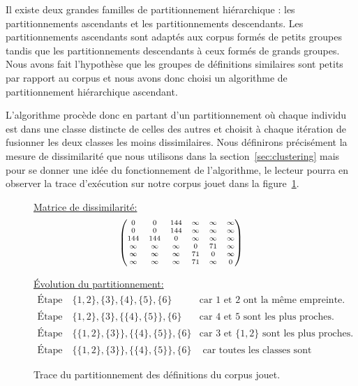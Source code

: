 Il existe deux grandes familles de partitionnement hiérarchique : les
partitionnements ascendants et les partitionnements descendants. Les
partitionnements ascendants sont adaptés aux corpus formés de petits
groupes tandis que les partitionnements descendants à ceux formés de
grands groupes. Nous avons fait l'hypothèse que les groupes de
définitions similaires sont petits par rapport au corpus et nous avons
donc choisi un algorithme de partitionnement hiérarchique ascendant.

L'algorithme procède donc en partant d'un partitionnement où chaque
individu est dans une classe distincte de celles des autres et choisit
à chaque itération de fusionner les deux classes les moins
dissimilaires. Nous définirons précisément la mesure de dissimilarité
que nous utilisons dans la section~\ref{sec:clustering} mais pour
se donner une idée du fonctionnement de l'algorithme, le lecteur
pourra en observer la trace d'exécution sur notre corpus jouet
dans la figure~\ref{fig:clustering-jouet}.

\begin{figure}
\underline{Matrice de dissimilarité:}
\[\scriptsize
\begin{pmatrix}
0 & 0 & 144 & \infty & \infty & \infty \\
0 & 0 & 144 & \infty & \infty & \infty \\
144 & 144 & 0 & \infty & \infty & \infty \\
\infty & \infty & \infty & 0 & 71 & \infty \\
\infty & \infty & \infty & 71 & 0 & \infty \\
\infty & \infty & \infty & 71 & \infty & 0 \\
\end{pmatrix}
\]

\underline{Évolution du partitionnement:}
\[
\begin{array}{rclr}
\text{Étape 1} & \{ 1, 2 \}, \{ 3 \}, \{ 4 \}, \{ 5 \}, \{ 6 \}
& \text{car }1 \text{ et } 2 \text{ ont la même empreinte.} \\
\text{Étape 2} & \{ 1, 2 \}, \{ 3 \}, \{ \{ 4 \}, \{ 5 \} \}, \{ 6 \}
& \text{car }4 \text{ et } 5 \text{ sont les plus proches.} \\
\text{Étape 3} & \{ \{ 1, 2 \}, \{ 3 \} \}, \{ \{ 4 \}, \{ 5 \} \}, \{ 6 \}
& \text{car }3 \text{ et } \{ 1, 2 \} \text{ sont les plus proches.} \\
\text{Étape 4} & \{ \{ 1, 2 \}, \{ 3 \} \}, \{ \{ 4 \}, \{ 5 \} \}, \{ 6 \}
& \text{ car toutes les classes sont absolument dissimilaires.}
\end{array}
\]

\caption{Trace du partitionnement des définitions du corpus jouet.}
\label{fig:clustering-jouet}
\end{figure}

